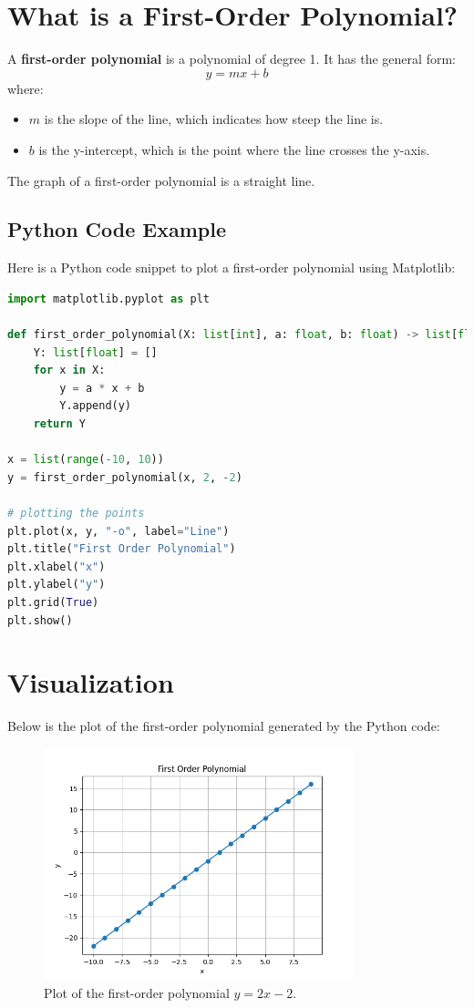 \section{What is a First-Order Polynomial?}

A \textbf{first-order polynomial} is a polynomial of degree 1. It has the general form:
\[
y = mx + b
\]
where:
\begin{itemize}
    \item \( m \) is the slope of the line, which indicates how steep the line is.
    \item \( b \) is the y-intercept, which is the point where the line crosses the y-axis.
\end{itemize}

The graph of a first-order polynomial is a straight line.

\clearpage
\subsection{Python Code Example}

Here is a Python code snippet to plot a first-order polynomial using Matplotlib:

\begin{lstlisting}[language=Python, caption=Python code to plot a first-order polynomial]
import matplotlib.pyplot as plt

def first_order_polynomial(X: list[int], a: float, b: float) -> list[float]:
    Y: list[float] = []
    for x in X:
        y = a * x + b
        Y.append(y)
    return Y

x = list(range(-10, 10))
y = first_order_polynomial(x, 2, -2)

# plotting the points
plt.plot(x, y, "-o", label="Line")
plt.title("First Order Polynomial")
plt.xlabel("x")
plt.ylabel("y")
plt.grid(True)
plt.show()
\end{lstlisting}

\section{Visualization}

Below is the plot of the first-order polynomial generated by the Python code:

\begin{figure}[t]
\centering
\includegraphics[width=0.8\textwidth]{PART3/1_polynomials/line.png}
\caption{Plot of the first-order polynomial $y = 2x - 2$.}
\end{figure}
